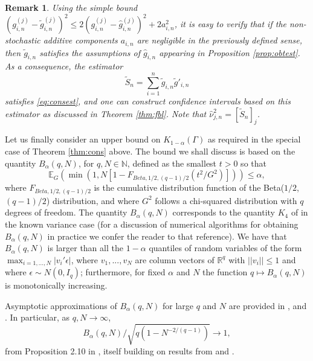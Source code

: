 \documentclass[preprint]{imsart}
\newtheorem{remark}[theorem]{Remark}
\numberwithin{equation}{section}
\begin{document}
\begin{remark}\label{rem:adaptive}
Using the simple bound $(g_{i,n}^{(j)} - \tilde{g}_{i,n}^{(j)})^2 \le 2(g_{i,n}^{(j)} - \hat{g}_{i,n}^{(j)})^2 + 2 a_{i,n}^2$, it is easy to verify that if the non-stochastic additive components $a_{i,n}$ are negligible in the previously defined sense, then $\tilde{g}_{i,n}$ satisfies the assumptions of $\hat{g}_{i,n}$ appearing in Proposition \ref{prop:obtest}. As a consequence, the estimator 
%
\begin{equation*}
\tilde{S}_n = \sum_{i = 1}^n \tilde{g}_{i,n}\tilde{g}'_{i,n}
\end{equation*}
%
satisfies \eqref{eq:consest}, and one can construct confidence intervals based on this estimator as discussed in Theorem \ref{thm:fbl}. Note that $\hat{\nu}^2_{j,n} = [\tilde{S}_n]_{j}$.
\end{remark}

Let us finally consider an upper bound on $K_{1-\alpha}(\Gamma)$ as required in the special case of Theorem \ref{thm:cons} above. The bound we shall discuss is based on the quantity $B_{\alpha}(q,N)$, for $q,N \in \mathbb{N}$, defined as the smallest $t >0$ so that
\[
\mathbb{E}_G \left( \min\left(1, N \left[  1 - F_{Beta,1/2,(q-1)/2} (t^2/G^2) \right] \right) \right) \leq \alpha,
\]
where $F_{Beta,1/2,(q-1)/2}$ is the cumulative distribution function of the \linebreak Beta($1/2$,$(q-1)/2$) distribution, and where $G^2$ follows a chi-squared distribution with $q$ degrees of freedom.
The quantity $B_{\alpha}(q,N)$ corresponds to the quantity $K_4$ of \cite{bachoc14valid} in the known variance case (for a discussion of numerical algorithms for obtaining $B_{\alpha}(q,N)$ in practice we confer the reader to that reference). We have \citep{bachoc14valid,Berk13} that $B_{\alpha}(q,N)$ is larger than all the $1-\alpha$ quantiles of random variables of the form
$\max_{i=1,...,N} |v_i' \epsilon|$, where $v_1,...,v_N$ are column vectors of $\mathbb{R}^q$ with $||v_i|| \leq 1$ and where $\epsilon \sim N(0,I_q)$; furthermore, for fixed $\alpha$ and $N$ the function $q\mapsto B_{\alpha}(q, N)$ is monotonically increasing.

Asymptotic approximations of $B_{\alpha}(q,N)$ for large $q$ and $N$ are provided in \cite{bachoc14valid}, \cite{Berk13} and \cite{zhang15spherical}. In particular, as $q,N \to \infty$, 
\[
B_{\alpha}(q,N)/\sqrt{q \left( 1-N
^{-2/\left( q-1\right) }\right) }\rightarrow 1,
\]
from Proposition 2.10 in \cite{bachoc14valid}, itself building on results from \cite{Berk13} and \cite{zhang15spherical}. 
\end{document}
